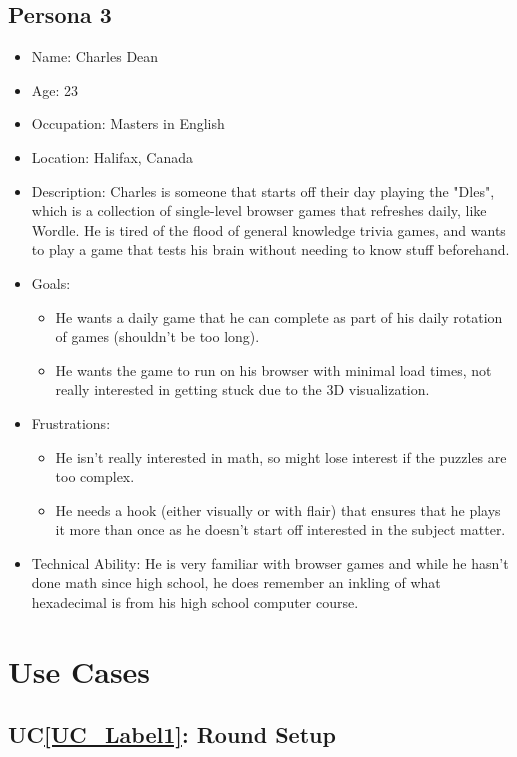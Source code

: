 \documentclass[12pt]{article}
\newcounter{ucnum} %
\newcommand{\ucref}[1]{UC\ref{#1}}
\begin{document}
\subsection{Persona 3}
\begin{itemize}
\item Name: Charles Dean
\item Age: 23
\item Occupation: Masters in English
\item Location: Halifax, Canada
\item Description: Charles is someone that starts off their day playing the "Dles", which is a collection of single-level browser games that refreshes daily, like Wordle. He is tired of the flood of general knowledge trivia games, and wants to play a game that tests his brain without needing to know stuff beforehand.
\item Goals:
\begin{itemize}
  \item He wants a daily game that he can complete as part of his daily rotation of games (shouldn't be too long).
  \item He wants the game to run on his browser with minimal load times, not really interested in getting stuck due to the 3D visualization.
\end{itemize}
\item Frustrations:
\begin{itemize}
  \item He isn't really interested in math, so might lose interest if the puzzles are too complex.
  \item He needs a hook (either visually or with flair) that ensures that he plays it more than once as he doesn't start off interested in the subject matter.
\end{itemize}
\item Technical Ability: He is very familiar with browser games and while he hasn't done math since high school, he does remember an inkling of what hexadecimal is from his high school computer course. 
\end{itemize}


\section{Use Cases}


 \label{UC_Label1}
\subsection{\ucref{UC_Label1}: Round Setup}
\end{document}
